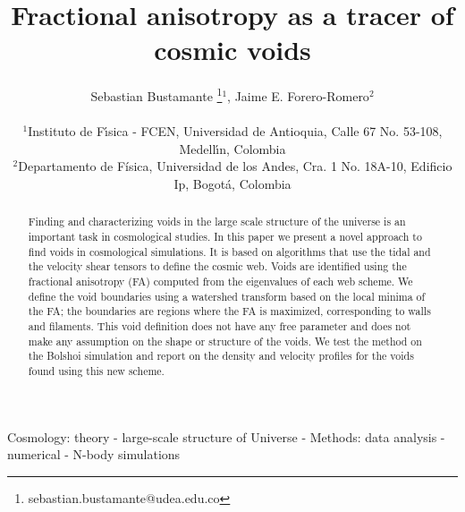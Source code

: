 \documentclass[a4,useAMS,usenatbib,usegraphicx]{latex/mn2e}
\begin{document}
\title{Fractional anisotropy as a tracer of cosmic voids}
\author[S. Bustamante and J.E. Forero-Romero]{
\parbox[t]{\textwidth}{\raggedright 
  Sebastian Bustamante \thanks{sebastian.bustamante@udea.edu.co}$^{1}$,
  Jaime E. Forero-Romero$^{2}$ 
}
\vspace*{6pt}\\
$^1$Instituto de F\'{\i}sica - FCEN, Universidad de Antioquia, Calle
67 No. 53-108, Medell\'{\i}n, Colombia\\ 
$^2$Departamento de F\'{i}sica, Universidad de los Andes, Cra. 1
No. 18A-10, Edificio Ip, Bogot\'a, Colombia
}

\maketitle

\begin{abstract}
Finding and characterizing voids in the large scale structure of the
universe is an important task in cosmological studies. 
In this paper we present a novel approach to find voids in
cosmological simulations.  
It is based on algorithms that use the tidal and the
velocity shear tensors to define the cosmic web.
Voids are identified using the fractional anisotropy (FA) computed
from the eigenvalues of each web scheme. We define the void boundaries
using a watershed transform based on the local minima of the FA; the
boundaries are regions where the FA is maximized, corresponding to
walls and filaments.  This void definition does not have any free
parameter and does not make any assumption on the shape or structure
of the voids.  We test the method on the Bolshoi simulation and report
on the density and velocity profiles for the voids found using this
new scheme.
\end{abstract}

\begin{keywords}
Cosmology: theory - large-scale structure of Universe -
Methods: data analysis - numerical - N-body simulations
\end{keywords}



\end{document}
